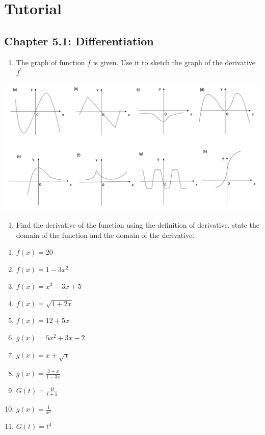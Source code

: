 \documentclass[]{book}
\providecommand{\tightlist}{%
  \setlength{\itemsep}{0pt}\setlength{\parskip}{0pt}}
\begin{document}
\newpage


\hypertarget{tutorial-1}{%
\section{Tutorial}\label{tutorial-1}}

\hypertarget{chapter-5.1-differentiation}{%
\subsection*{Chapter 5.1: Differentiation}\label{chapter-5.1-differentiation}}

\begin{enumerate}
\def\labelenumi{\arabic{enumi}.}
\tightlist
\item
  The graph of function \(f\) is given. Use it to sketch the graph of the derivative \(f^\prime\)
\end{enumerate}

\begin{center}\includegraphics[width=1\linewidth]{figure/5Derivatives-8} \end{center}

\begin{enumerate}
\def\labelenumi{\arabic{enumi}.}
\setcounter{enumi}{1}
\tightlist
\item
  Find the derivative of the function using the definition of derivative. state the domain of the function and the domain of the derivative.
\end{enumerate}

\begin{enumerate}
\def\labelenumi{(\alph{enumi})}
\tightlist
\item
  \(f(x) = 20\)
\item
  \(f(x) = 1-3x^2\)
\item
  \(f(x) = x^3 -3x+5\)
\item
  \(f(x) = \sqrt{1+2x}\)
\item
  \(f(x) = 12+5x\)
\item
  \(g(x) = 5x^2+3x-2\)
\item
  \(g(x) = x+\sqrt{x}\)
\item
  \(g(x) = \frac{3+x}{1-3x}\)
\item
  \(G(t) = \frac{4t}{t+1}\)
\item
  \(g(x) = \frac{1}{x^2}\)
\item
  \(G(t) = t^4\)
\end{enumerate}
\end{document}
